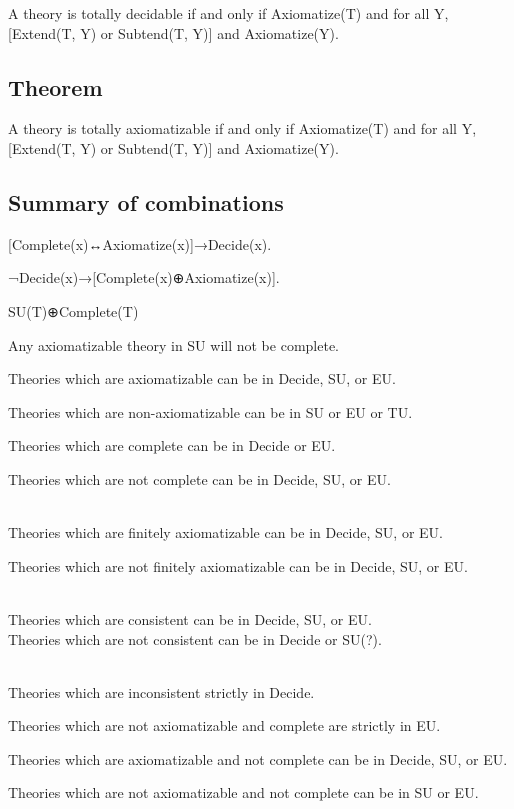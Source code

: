 A theory is totally decidable if and only if Axiomatize(T) and for all
Y, {[}Extend(T, Y) or Subtend(T, Y){]} and Axiomatize(Y).

\hypertarget{theorem-7}{%
\subsection{Theorem}\label{theorem-7}}

A theory is totally axiomatizable if and only if Axiomatize(T) and for
all Y, {[}Extend(T, Y) or Subtend(T, Y){]} and Axiomatize(Y).

\hypertarget{summary-of-combinations}{%
\subsection{Summary of combinations}\label{summary-of-combinations}}

{[}Complete(x)↔Axiomatize(x){]}→Decide(x).

¬Decide(x)→{[}Complete(x)⊕Axiomatize(x){]}.

SU(T)⊕Complete(T)

Any axiomatizable theory in SU will not be complete.

Theories which are axiomatizable can be in Decide, SU, or EU.

Theories which are non-axiomatizable can be in SU or EU or TU.

Theories which are complete can be in Decide or EU.

Theories which are not complete can be in Decide, SU, or EU.\\
\strut \\
Theories which are finitely axiomatizable can be in Decide, SU, or EU.

Theories which are not finitely axiomatizable can be in Decide, SU, or
EU.\\
\strut \\
Theories which are consistent can be in Decide, SU, or EU.\\
Theories which are not consistent can be in Decide or SU(?).\\
\strut \\
Theories which are inconsistent strictly in Decide.

Theories which are not axiomatizable and complete are strictly in EU.

Theories which are axiomatizable and not complete can be in Decide, SU,
or EU.

Theories which are not axiomatizable and not complete can be in SU or
EU.

